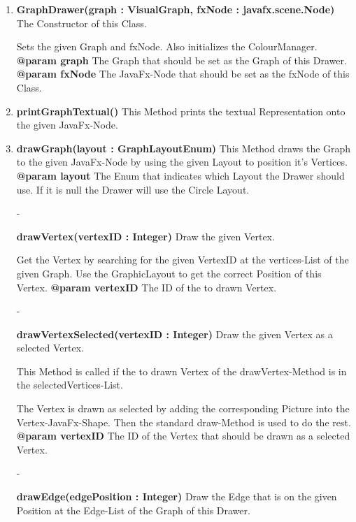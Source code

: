 				\begin{enumerate}[+]
					\item{
						\textbf{GraphDrawer(graph : VisualGraph, fxNode : javafx.scene.Node)} \newline
						The Constructor of this Class.
						
						Sets the given Graph and fxNode.
						Also initializes the ColourManager.
						\newline
						\textbf{@param graph}
							The Graph that should be set as the Graph of this Drawer.
							\newline
						\textbf{@param fxNode}
							The JavaFx-Node that should be set as the fxNode of this Class.
							\newline
					}
					\item{
						\textbf{printGraphTextual()} \newline
						This Method prints the textual Representation onto the given JavaFx-Node.
						\newline
					}
					\item{
						\textbf{drawGraph(layout : GraphLayoutEnum)} \newline
						This Method draws the Graph to the given JavaFx-Node by using the given Layout to position it's Vertices.
						\newline
						\textbf{@param layout}
							The Enum that indicates which Layout the Drawer should use.
							If it is null the Drawer will use the Circle Layout.
							\newline
					}
					\item[-]{
						\textbf{drawVertex(vertexID : Integer)} \newline
						Draw the given Vertex.
						
						Get the Vertex by searching for the given VertexID at the vertices-List of the given Graph.
						Use the GraphicLayout to get the correct Position of this Vertex.
						\newline
						\textbf{@param vertexID}
							The ID of the to drawn Vertex.
							\newline
					}
					\item[-]{
						\textbf{drawVertexSelected(vertexID : Integer)} \newline
						Draw the given Vertex as a selected Vertex.
						
						This Method is called if the to drawn Vertex of the drawVertex-Method is in the selectedVertices-List.
						
						The Vertex is drawn as selected by adding the corresponding Picture into the Vertex-JavaFx-Shape.
						Then the standard draw-Method is used to do the rest.
						\newline
						\textbf{@param vertexID}
						The ID of the Vertex that should be drawn as a selected Vertex.
						\newline
					}
					\item[-]{
						\textbf{drawEdge(edgePosition : Integer)} \newline
						Draw the Edge that is on the given Position at the Edge-List of the Graph of this Drawer.
						
}
\end{enumerate}
